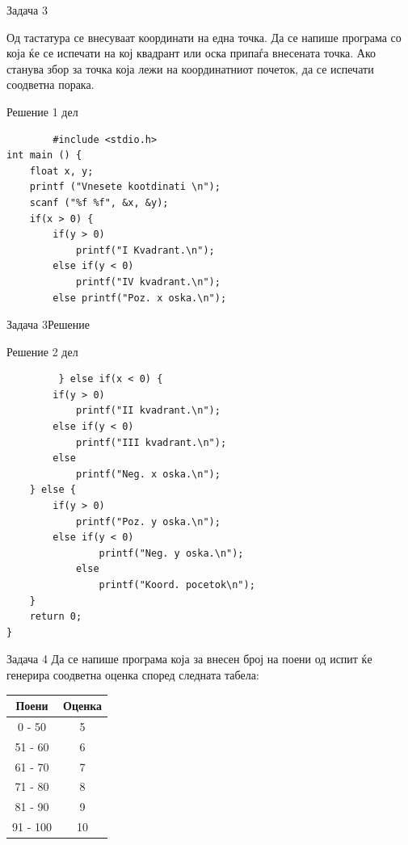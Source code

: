 \begin{frame}[fragile]{Задача 3}
\begin{scriptsize}
Од тастатура се внесуваат координати на една точка. Да се напише програма со која ќе се испечати на кој квадрант или оска припаѓа внесената точка. Ако станува збор за точка која лежи на координатниот почеток, да се испечати соодветна порака.
\end{scriptsize}
\pause
    \begin{exampleblock}{Решение 1 дел}
    \begin{lstlisting}
        #include <stdio.h> 
int main () { 
    float x, y;
    printf ("Vnesete kootdinati \n"); 
    scanf ("%f %f", &x, &y); 
    if(x > 0) { 
        if(y > 0) 
            printf("I Kvadrant.\n");
        else if(y < 0)
            printf("IV kvadrant.\n"); 
        else printf("Poz. x oska.\n");
        \end{lstlisting}
    \end{exampleblock}
\end{frame}



\begin{frame}[fragile]{Задача 3}{Решение}
    \begin{exampleblock}{Решение 2 дел}
        \begin{lstlisting}
         } else if(x < 0) {
        if(y > 0)
            printf("II kvadrant.\n");
        else if(y < 0) 
            printf("III kvadrant.\n");
        else
            printf("Neg. x oska.\n");
    } else {
        if(y > 0)
            printf("Poz. y oska.\n");
        else if(y < 0)
                printf("Neg. y oska.\n");
            else
                printf("Koord. pocetok\n");
    }
    return 0; 
}
        \end{lstlisting}
    \end{exampleblock}
\end{frame}



\begin{frame}[fragile]{Задача 4}
Да се напише програма која за внесен број на поени од испит ќе генерира соодветна оценка според следната табела:
\begin{center}
\begin{tabular}{|c|c|}
\hline \textbf{Поени} & \textbf{Оценка} \\ 
\hline 0 - 50 & 5 \\ 
\hline 51 - 60 & 6 \\ 
\hline 61 - 70 & 7 \\ 
\hline 71 - 80 & 8 \\ 
\hline 81 - 90 & 9 \\ 
\hline 91 - 100 & 10 \\ 
\hline
\end{tabular} 
\end{center}
\end{frame}

